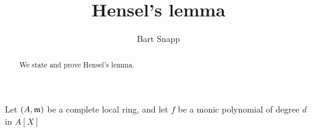 \documentclass{ximera}
\author{Bart Snapp}
\title{Hensel's lemma}
\begin{document}
\begin{abstract}
  We state and prove Hensel's lemma.
\end{abstract}
\maketitle

\begin{theorem}
  Let $(A,\mathfrak{m})$ be a complete local ring, and let $f$ be a monic
  polynomial of degree $d$ in $A[X]$
\end{theorem}
\end{document}
